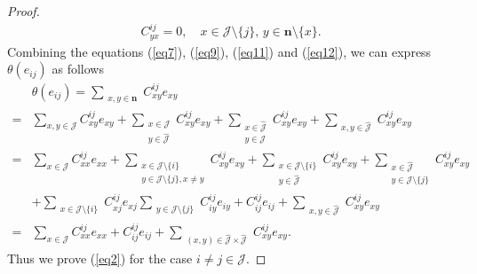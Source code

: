 \documentclass[reqno]{amsart}
\theoremstyle{plain}
\theoremstyle{definition}
\begin{document}
\begin{proof}
 \begin{align}\label{eq12}
C_{yx}^{ij} = 0, \quad x \in \mathcal{J} \setminus \{j\}, \, y \in \mathbf{n} \setminus \{x\}.
\end{align}
Combining the equations (\ref{eq7}), (\ref{eq9}), (\ref{eq11}) and (\ref{eq12}), we can express $\theta(e_{ij})$ as follows
\[
\begin{aligned}
&\theta(e_{ij})=\sum_{\substack{x,y \in \mathbf{n}}} C_{xy}^{ij} e_{xy}\\
=& \sum_{x,y \in \mathcal{J}} C_{xy}^{ij} e_{xy} + \sum_{\substack{x \in \mathcal{J} \\ y \in \hat{\mathcal{J}}}} C_{xy}^{ij} e_{xy} + \sum_{\substack{x \in \hat{\mathcal{J}} \\ y \in \mathcal{J}}} C_{xy}^{ij} e_{xy} + \sum_{\substack{x,y \in \hat{\mathcal{J}}}} C_{xy}^{ij} e_{xy} \\
=& \sum_{x \in \mathcal{J}} C_{xx}^{ij} e_{xx} +\sum_{\substack{x \in \mathcal{J}\setminus \{i\} \\y \in \mathcal{J}\setminus \{j\}, x\neq y }} C_{xy}^{ij} e_{xy} + \sum_{\substack{x \in \mathcal{J}\setminus \{i\} \\y \in \hat{\mathcal{J}} }} C_{xy}^{ij} e_{xy} +
\sum_{\substack{x \in \hat{\mathcal{J}}\\y \in \mathcal{J}\setminus \{j\} }} C_{xy}^{ij} e_{xy} \\
&+\sum_{\substack{x \in \mathcal{J}\setminus \{i\}  }} C_{xj}^{ij} e_{xj}
\sum_{\substack{y \in \mathcal{J}\setminus \{j\} }} C_{iy}^{ij} e_{iy}+C_{ij}^{ij} e_{ij}
+ \sum_{\substack{x,y \in \hat{\mathcal{J}}}} C_{xy}^{ij} e_{xy} \\
=& \sum_{x \in \mathcal{J}} C_{xx}^{ij} e_{xx} + C_{ij}^{ij} e_{ij} + 
 \sum_{\substack{(x,y) \in \hat{\mathcal{J}}\times \hat{\mathcal{J}}}} C_{xy}^{ij} e_{xy}.
\end{aligned}
\]
Thus we prove (\ref{eq2}) for the case $ i \neq j \in \mathcal{J} $.


\end{proof}
\end{document}
